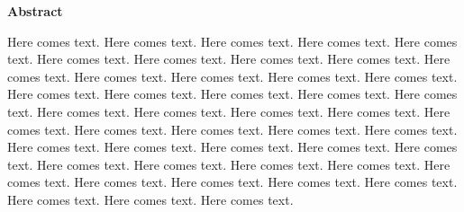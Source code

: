 \begin{center}
{\color{chaptercolor}\textbf{\Large Abstract}}
\end{center}

Here comes text. Here comes text. Here comes text. Here comes text. Here comes text. Here comes text. Here comes text. Here comes text. Here comes text. Here comes text. Here comes text. Here comes text. Here comes text. Here comes text. Here comes text. Here comes text. Here comes text. Here comes text. Here comes text. Here comes text. Here comes text. Here comes text. Here comes text. Here comes text. Here comes text. Here comes text. Here comes text. Here comes text. Here comes text. Here comes text. Here comes text. Here comes text. Here comes text. Here comes text. Here comes text. Here comes text. Here comes text. Here comes text. Here comes text. Here comes text. Here comes text. Here comes text. Here comes text. Here comes text. Here comes text.

